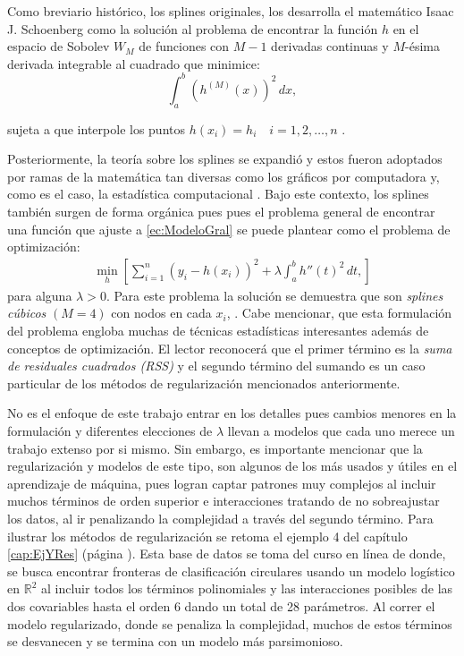 \documentclass[../../Main/Main.tex]{subfiles}
\begin{document}
Como breviario histórico, los splines originales, los desarrolla  el matemático Isaac J. Schoenberg como la solución al problema de encontrar la función $h$ en el espacio de Sobolev $W_{M}$ de funciones con $M-1$ derivadas continuas y $M$-ésima derivada integrable al cuadrado que minimice:
$$\int_a^b(h^{(M)}(x))^2\,dx,$$ 

sujeta a que interpole los puntos $h(x_i) = h_i \quad i = 1,2,\ldots,n$ \autocite{schoenberg1964spline}. 

Posteriormente, la teoría sobre los splines se expandió y estos fueron adoptados por ramas de la matemática tan diversas como los gráficos por computadora y, como es el caso, la estadística computacional \citet{wahba1990splines}. Bajo este contexto, los splines también surgen de forma orgánica pues pues el problema general de encontrar una función que ajuste a \eqref{ec:ModeloGral} se puede plantear como el problema de optimización:
\begin{align}
	\min_{h}\left[ \sum_{i=1}^n(y_i - h(x_i))^2 + \lambda\int_a^b h''(t)^2 \, dt, \right] \label{ec:SplinesConRegularizacion}
\end{align}
para alguna $\lambda > 0$. Para este problema la solución se demuestra que son \textit{splines cúbicos} $(M = 4)$ con nodos en cada $x_i$, \citet{green1994nonparametric}. Cabe mencionar, que esta formulación del problema engloba muchas de técnicas estadísticas interesantes además de conceptos de optimización. El lector reconocerá que el primer término es la \textit{suma de residuales cuadrados (RSS)} y el segundo término del sumando es un caso particular de los métodos de regularización mencionados anteriormente. 

No es el enfoque de este trabajo entrar en los detalles pues cambios menores en la formulación y diferentes elecciones de $\lambda$ llevan a modelos que cada uno merece un trabajo extenso por si mismo. Sin embargo, es importante mencionar que la regularización y modelos de este tipo, son algunos de los más usados y útiles en el aprendizaje de máquina, pues logran captar patrones muy complejos al incluir muchos términos de orden superior e interacciones tratando de no sobreajustar los datos, al ir penalizando la complejidad a través del segundo término. Para ilustrar los métodos de regularización se retoma el ejemplo 4 del capítulo \ref{cap:EjYRes} (página \pageref{tab:T4}). Esta base de datos se toma del curso en línea de \citet{andrew2018ml} donde, se busca encontrar fronteras de clasificación circulares usando un modelo logístico en $\mathbb{R}^2$ al incluir todos los términos polinomiales y las interacciones posibles de las dos covariables hasta el orden 6 dando un total de 28 parámetros. Al correr el modelo regularizado, donde se penaliza la complejidad, muchos de estos términos se desvanecen y se termina con un modelo más parsimonioso. 
\end{document}
